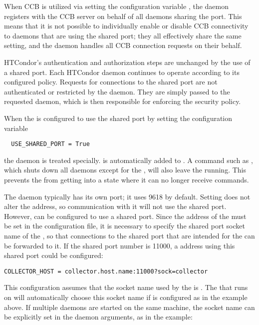 When CCB is utilized via setting the configuration variable
,
the  daemon registers with
the CCB server on behalf of all daemons sharing the port.
This means that it is not possible to individually enable or disable
CCB connectivity to daemons that are using the shared port;
they all effectively share the same setting,
and the  daemon handles all CCB connection
requests on their behalf.

HTCondor's authentication and authorization steps are unchanged by the
use of a shared port.  Each HTCondor daemon continues to operate
according to its configured policy.  Requests for connections to the
shared port are not authenticated or restricted by
the  daemon.
They are simply passed to the requested daemon,
which is then responsible for enforcing the security policy.

When the  is configured to use the shared port
by setting the configuration variable
\begin{verbatim}
  USE_SHARED_PORT = True
\end{verbatim}
the  daemon is treated specially. 
 is automatically added to .
A command such as ,
which shuts down all daemons except for the ,
will also leave the  running.
This prevents the  from getting into a state
where it can no longer receive commands.

The  daemon typically has its own port;
it uses 9618 by default.
Setting  does not alter the
 address, so communication with it will
not use the shared port.
However,  can be configured to use a shared port.
Since the address of the  must be set in 
the configuration file,
it is necessary to specify the shared port socket name of 
the ,
so that connections to the shared port that are intended for 
the  can be forwarded to it.
If the shared port number is 11000, a  address using this
shared port could be configured:

\footnotesize
\begin{verbatim}
COLLECTOR_HOST = collector.host.name:11000?sock=collector
\end{verbatim}
\normalsize

This configuration assumes that the socket name used by 
the  is .
The  that runs on 
will automatically choose this socket name if 
is configured as in the example above.
If multiple  daemons are started on the same
machine, the socket name can be explicitly set in the daemon arguments,
as in the example:

